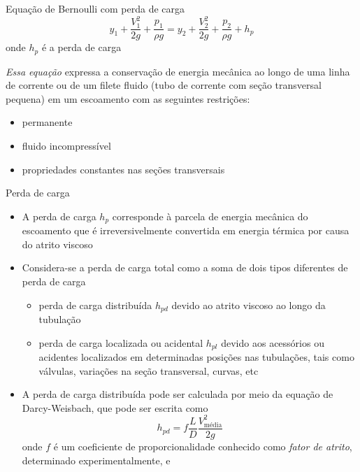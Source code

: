 \documentclass[t,%
brazilian,%
11pt,%
aspectratio=169,%
table%
]{beamer}
\begin{document}
\begin{frame}{Equação de Bernoulli com perda de carga}
    \[
        y_1 + \frac{V_1^2}{2g}+\frac{p_1}{\rho g} = y_2 + \frac{V_2^2}{2g} + \frac{p_2}{\rho g}
        +h_p
    \]
    onde \(h_p\) é a perda de carga

    \textit{Essa equação} expressa a conservação de energia mecânica
    ao longo de uma linha de corrente ou de um filete fluido (tubo de 
    corrente com seção transversal pequena) em um escoamento com as seguintes restrições:
    \begin{itemize}
        \item permanente
        \item fluido incompressível
        \item propriedades constantes nas seções transversais
    \end{itemize}
\end{frame}

\begin{frame}{Perda de carga}
    \begin{itemize}
        \item A perda de carga \(h_p\) corresponde à parcela de energia
            mecânica do escoamento que é irreversivelmente convertida em
            energia térmica por causa do atrito viscoso 

        \item Considera-se a perda de carga total como a soma de dois tipos
            diferentes de perda de carga
            \begin{itemize}
                \item perda de carga distribuída \(h_{pd}\) devido ao atrito viscoso
                    ao longo da tubulação
                \item perda de carga localizada ou acidental \(h_{pl}\) devido aos
                    acessórios ou acidentes localizados em determinadas
                    posições nas tubulações, tais como válvulas, variações na
                    seção transversal, curvas, etc
            \end{itemize}
        \item A perda de carga distribuída pode ser calculada por meio da
            equação de Darcy-Weisbach, que pode ser escrita como
            \[
                h_{pd} = f\frac{L}{D}\frac{V_\text{média}^2}{2g}
            \]
            onde \(f\) é um coeficiente de proporcionalidade conhecido como \textit{fator de atrito},
            determinado experimentalmente, e
    \end{itemize}
\end{frame}
\end{document}
